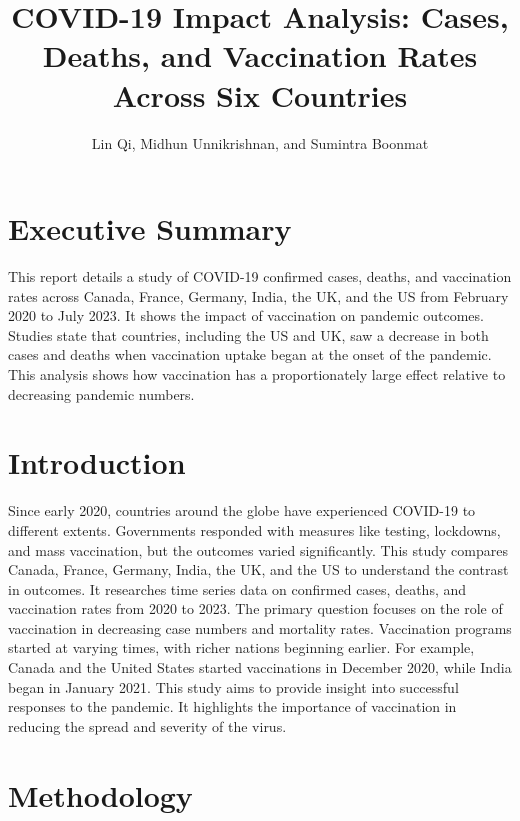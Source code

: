 \documentclass[
  11pt,
]{article}
\title{COVID-19 Impact Analysis: Cases, Deaths, and Vaccination Rates
Across Six Countries}
\author{Lin Qi, Midhun Unnikrishnan, and Sumintra Boonmat}
\date{}
\renewcommand*\contentsname{Table of contents}
\newcommand\contentsname{Table of contents}
\begin{document}
\maketitle

\renewcommand*\contentsname{Table of contents}
{
\hypersetup{linkcolor=}
\setcounter{tocdepth}{3}
\tableofcontents
}

\section{Executive Summary}\label{sec-intro}

This report details a study of COVID-19 confirmed cases, deaths, and
vaccination rates across Canada, France, Germany, India, the UK, and the
US from February 2020 to July 2023. It shows the impact of vaccination
on pandemic outcomes. Studies state that countries, including the US and
UK, saw a decrease in both cases and deaths when vaccination uptake
began at the onset of the pandemic. This analysis shows how vaccination
has a proportionately large effect relative to decreasing pandemic
numbers.

\section{Introduction}\label{introduction}

Since early 2020, countries around the globe have experienced COVID-19
to different extents. Governments responded with measures like testing,
lockdowns, and mass vaccination, but the outcomes varied significantly.
This study compares Canada, France, Germany, India, the UK, and the US
to understand the contrast in outcomes. It researches time series data
on confirmed cases, deaths, and vaccination rates from 2020 to 2023. The
primary question focuses on the role of vaccination in decreasing case
numbers and mortality rates. Vaccination programs started at varying
times, with richer nations beginning earlier. For example, Canada and
the United States started vaccinations in December 2020, while India
began in January 2021. This study aims to provide insight into
successful responses to the pandemic. It highlights the importance of
vaccination in reducing the spread and severity of the virus.

\section{Methodology}\label{sec-method}
\end{document}
